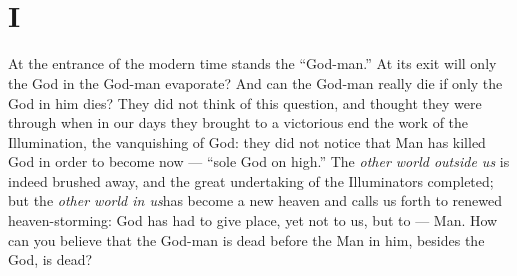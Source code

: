 
\chapter[Part Second: I]{\\
I}

\medskip{}

\noindent{}At the entrance of the modern time stands the ``God-man.'' At its 
exit will only the God in the God-man evaporate? And can the God-man really 
die if only the God in him dies? They did not think of this question, and 
thought they were through when in our days they brought to a victorious end 
the work of the Illumination, the vanquishing of God: they did not notice that 
Man has killed God in order to become now --- ``sole God on high.'' The 
\textit{other world outside us} is indeed brushed away, and the great 
undertaking of the Illuminators completed; but the \textit{other world in 
us}has become a new heaven and calls us forth to renewed heaven-storming: God 
has had to give place, yet not to us, but to --- Man. How can you believe that 
the God-man is dead before the Man in him, besides the God, is dead?

\medskip{}
